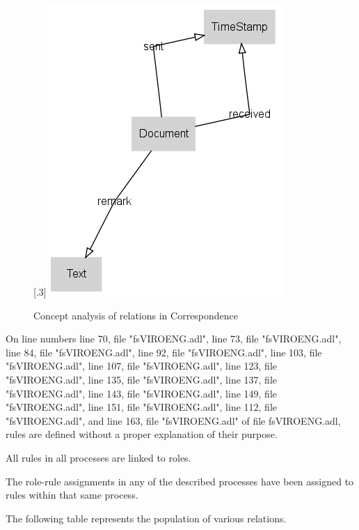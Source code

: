 \documentclass[10pt,a4paper]{report}              %
\theoremstyle{plain}\theorembodyfont{\rmfamily}\newtheorem{definition}{Definition}[section]
\theoremstyle{plain}\theorembodyfont{\rmfamily}\newtheorem{designrule}[definition]{Requirement}
\begin{document}
\begin{figure}[htb]
\begin{center}
\scalebox{.3}[.3]{\includegraphics{LatCorrespondence}}
\caption{Concept analysis of relations in Correspondence}
\label{fig:LatCorrespondence}
\end{center}
\end{figure}
On line numbers line 70, file "fsVIROENG.adl", line 73, file "fsVIROENG.adl", line 84, file "fsVIROENG.adl", line 92, file "fsVIROENG.adl", line 103, file "fsVIROENG.adl", line 107, file "fsVIROENG.adl", line 123, file "fsVIROENG.adl", line 135, file "fsVIROENG.adl", line 137, file "fsVIROENG.adl", line 143, file "fsVIROENG.adl", line 149, file "fsVIROENG.adl", line 151, file "fsVIROENG.adl", line 112, file "fsVIROENG.adl", and line 163, file "fsVIROENG.adl" of file fsVIROENG.adl, rules are defined without a proper explanation of their purpose. 

All rules in all processes are linked to roles.

The role-rule assignments in any of the described processes have been assigned to rules within that same process.

The following table represents the population of various relations. 
\end{document}
